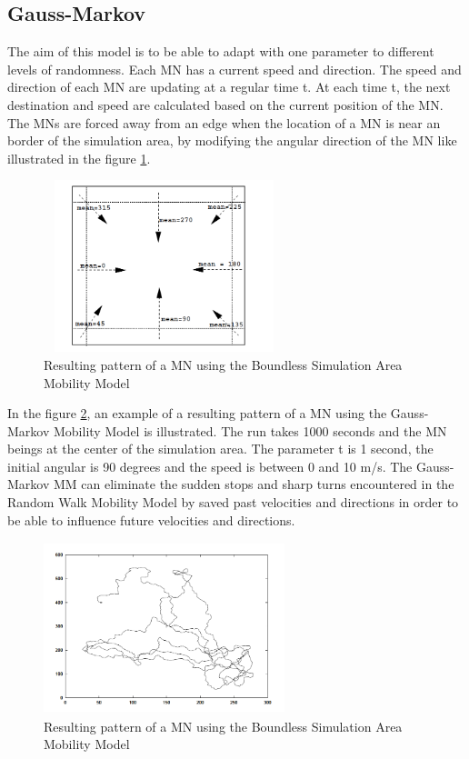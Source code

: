 \subsection{Gauss-Markov}

The aim of this model is to be able to adapt with one parameter to different levels of randomness.
Each MN has a current speed and direction. The speed and direction of each MN are updating at a regular time t. At each time t, the next destination and speed are calculated based on the current position of the MN. The MNs are forced away from an edge when the location of a MN is near an border of the simulation area, by modifying the angular direction of the MN like illustrated in the figure \ref{Gauss-MarkovFig1}.

\begin{figure}[h]
\center
\includegraphics[width=7cm,height=50mm]{../images/gauss-markovmodel1.png}
\caption{\label{Gauss-MarkovFig1}Resulting pattern of a MN using the Boundless Simulation Area Mobility Model}
\end{figure}

In the figure \ref{Gauss-MarkovFig2}, an example of a resulting pattern of a MN using the Gauss-Markov Mobility Model is illustrated. The run takes 1000 seconds and the MN beings at the center of the simulation area. The parameter t is 1 second, the initial angular is 90 degrees and the speed is between 0 and 10 m/s. The Gauss-Markov MM can eliminate the sudden stops and sharp turns encountered in the Random Walk Mobility Model by saved past velocities and directions in order to be able to influence future velocities and directions.

\begin{figure}[h]
\center
\includegraphics[width=7cm,height=50mm]{../images/gauss-markovmodel2.png}
\caption{\label{Gauss-MarkovFig2}Resulting pattern of a MN using the Boundless Simulation Area Mobility Model}
\end{figure}


